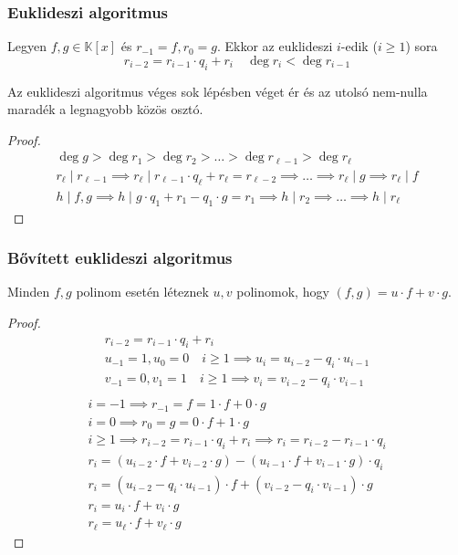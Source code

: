 \subsubsection{Euklideszi algoritmus}
\begin{definition}
	Legyen $f, g \in \mathbb{K}[x]$ és $r_{-1} = f, r_0 = g$.
	Ekkor az euklideszi $i$-edik ($i \geq 1$) sora
	\begin{equation*}
		r_{i - 2} = r_{i - 1} \cdot q_i + r_i \quad \deg r_i < \deg r_{i - 1}
	\end{equation*}
\end{definition}
\begin{theorem}
	Az euklideszi algoritmus véges sok lépésben véget ér és
	az utolsó nem-nulla maradék a legnagyobb közös osztó.
\end{theorem}
\begin{proof}
	\begin{gather*}
		\deg g > \deg r_1 > \deg r_2 > \dots > \deg r_{\ell - 1} > \deg r_\ell \\
		r_\ell \mid r_{\ell - 1} \implies
		r_\ell \mid r_{\ell - 1} \cdot q_\ell + r_\ell = r_{\ell - 2} \implies
		\dots \implies r_\ell \mid g \implies r_\ell \mid f \\
		h \mid f, g \implies
		h \mid g \cdot q_1 + r_1 - q_1 \cdot g = r_1 \implies
		h \mid r_2 \implies \dots \implies h \mid r_\ell
	\end{gather*}
\end{proof}
\subsubsection{Bővített euklideszi algoritmus}
\begin{theorem}
	Minden $f, g$ polinom esetén léteznek $u, v$ polinomok,
	hogy $(f, g) = u \cdot f + v \cdot g$.
\end{theorem}
\begin{proof}
	\begin{gather*}
		r_{i - 2} = r_{i - 1} \cdot q_i + r_i \\
		u_{-1} = 1, u_0 = 0 \quad i \geq 1 \implies
		u_i = u_{i - 2} - q_i \cdot u_{i - 1} \\
		v_{-1} = 0, v_1 = 1 \quad i \geq 1 \implies
		v_i = v_{i - 2} - q_i \cdot v_{i - 1} \\
	\end{gather*}
	\begin{gather*}
		i = -1 \implies r_{-1} = f = 1 \cdot f + 0 \cdot g \\
		i = 0 \implies r_0 = g = 0 \cdot f + 1 \cdot g \\
		i \geq 1 \implies r_{i - 2} = r_{i - 1} \cdot q_i + r_i \implies
		r_i = r_{i - 2} - r_{i - 1} \cdot q_i \\
		r_i = \left( u_{i - 2} \cdot f + v_{i - 2} \cdot g \right) -
		\left( u_{i - 1} \cdot f + v_{i - 1} \cdot g \right) \cdot q_i \\
		r_i = \left( u_{i - 2} - q_i \cdot u_{i - 1} \right) \cdot f +
		\left( v_{i - 2} - q_i \cdot v_{i - 1} \right) \cdot g \\
		r_i = u_i \cdot f + v_i \cdot g \\
		r_\ell = u_\ell \cdot f + v_\ell \cdot g
	\end{gather*}
\end{proof}
